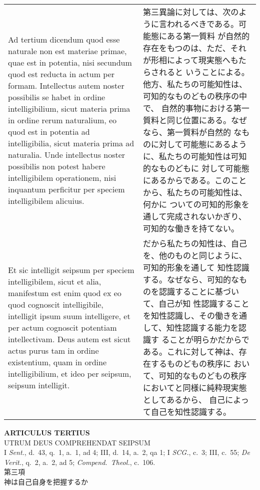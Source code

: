 \documentclass[10pt]{jsarticle} %
\begin{document}
\begin{longtable}{p{21em}p{21em}}
\\


Ad tertium dicendum quod esse naturale non est materiae primae, quae
est in potentia, nisi secundum quod est reducta in actum per
formam. Intellectus autem noster possibilis se habet in ordine
intelligibilium, sicut materia prima in ordine rerum naturalium, eo
quod est in potentia ad intelligibilia, sicut materia prima ad
naturalia. Unde intellectus noster possibilis non potest habere
intelligibilem operationem, nisi inquantum perficitur per speciem
intelligibilem alicuius.

&

第三異論に対しては、次のように言われるべきである。可能態にある第一質料
が自然的存在をもつのは、ただ、それが形相によって現実態へもたらされると
いうことによる。他方、私たちの可能知性は、可知的なものどもの秩序の中で、
自然的事物における第一質料と同じ位置にある。なぜなら、第一質料が自然的
なものに対して可能態にあるように、私たちの可能知性は可知的なものどもに
対して可能態にあるからである。このことから、私たちの可能知性は、何かに
ついての可知的形象を通して完成されないかぎり、可知的な働きを持てない。


\\

Et sic intelligit seipsum per speciem intelligibilem, sicut et alia,
manifestum est enim quod ex eo quod cognoscit intelligibile,
intelligit ipsum suum intelligere, et per actum cognoscit potentiam
intellectivam. Deus autem est sicut actus purus tam in ordine
existentium, quam in ordine intelligibilium, et ideo per seipsum,
seipsum intelligit.


&

だから私たちの知性は、自己を、他のものと同じように、可知的形象を通して
知性認識する。なぜなら、可知的なものを認識することに基づいて、自己が知
性認識することを知性認識し、その働きを通して、知性認識する能力を認識す
ることが明らかだからである。これに対して神は、存在するものどもの秩序に
おいて、可知的なものどもの秩序においてと同様に純粋現実態としてあるから、
自己によって自己を知性認識する。



\end{longtable}
\newpage

\begin{center}
{\Large {\bf ARTICULUS TERTIUS}}\\ {\large UTRUM DEUS COMPREHENDAT
SEIPSUM}\\ {\footnotesize I {\itshape Sent.}, d.~43, q.~1, a.~1, ad 4;
III, d.~14, a.~2, qa 1; I {\itshape SCG.}, c.~3; III, c.~55; {\itshape
De Verit.}, q.~2, a.~2, ad 5; {\itshape Compend.~Theol.}, c.~106.}\\
{\Large 第三項\\神は自己自身を把握するか}
\end{center}
\end{document}
